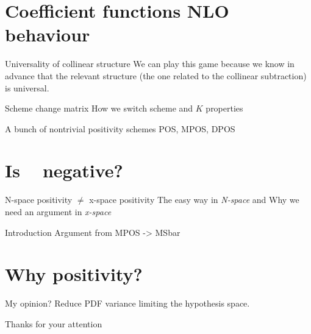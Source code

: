 \documentclass[9pt]{beamer}
\DeclareMathOperator{\msbar}{\overline{MS}}
\begin{document}
\section{Coefficient functions NLO behaviour}
\begin{frame}{Universality of collinear structure}
    We can play this game because we know in advance that the relevant structure (the one related to the collinear subtraction) is universal.
\end{frame}

\begin{frame}{Scheme change matrix}
    How we switch scheme and $K$ properties
\end{frame}

\begin{frame}{A bunch of nontrivial positivity schemes}
    POS, MPOS, DPOS
\end{frame}

\section{Is $\msbar$ negative?}
\begin{frame}{N-space positivity $\neq$ x-space positivity}
    The easy way in \textit{N-space} and Why we need an argument in \textit{x-space}
\end{frame}

\begin{frame}{Introduction}
    Argument from MPOS -> MSbar
\end{frame}

\section{Why positivity?}
\begin{frame}{My opinion?}
    Reduce PDF variance limiting the hypothesis space. 
\end{frame}


\begin{frame}[standout]
    Thanks for your attention
\end{frame}
\end{document}
